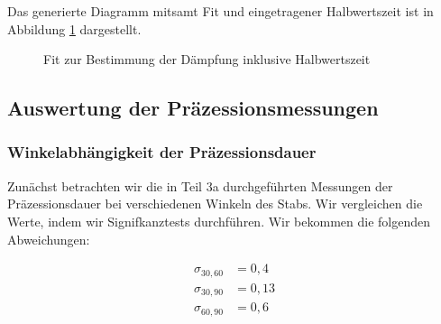 \documentclass{article}
\begin{document}
Das generierte Diagramm mitsamt Fit und eingetragener Halbwertszeit ist in Abbildung \ref{plt:Daempfung} dargestellt. 

\phantom{.}

\begin{figure}[!h]
    \centering
    \caption{Fit zur Bestimmung der Dämpfung inklusive Halbwertszeit}
    \label{plt:Daempfung}
\end{figure}

\phantom{.}

\clearpage
\newpage

\subsection{Auswertung der Präzessionsmessungen}

\subsubsection{Winkelabhängigkeit der Präzessionsdauer}

Zunächst betrachten wir die in Teil 3a durchgeführten Messungen der Präzessionsdauer bei verschiedenen Winkeln des Stabs. Wir vergleichen die Werte, indem wir Signifkanztests durchführen. Wir bekommen die folgenden Abweichungen:

\begin{equation}
    \begin{split}
        \sigma_{30,60} &= 0,4 \\
        \sigma_{30,90} &= 0,13 \\
        \sigma_{60,90} &= 0,6 \\
    \end{split}
\end{equation}
\end{document}
